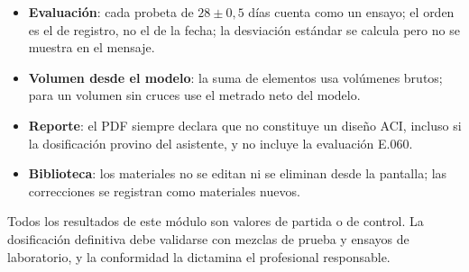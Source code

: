 \begin{itemize}
	      los de 0,15 a 4,75\,mm. Los límites de los husos son los del código; verifíquense contra la edición de la
	      NTP~400.037 y de la ASTM~C33 que corresponda. El módulo de finura calculado no actualiza el material.
	\item \textbf{Evaluación}: cada probeta de $28 \pm 0{,}5$ días cuenta como un ensayo; el orden es el de registro, no
	      el de la fecha; la desviación estándar se calcula pero no se muestra en el mensaje.
	\item \textbf{Volumen desde el modelo}: la suma de elementos usa volúmenes brutos; para un volumen sin cruces use el
	      metrado neto del modelo.
	\item \textbf{Reporte}: el PDF siempre declara que no constituye un diseño ACI, incluso si la dosificación provino
	      del asistente, y no incluye la evaluación E.060.
	\item \textbf{Biblioteca}: los materiales no se editan ni se eliminan desde la pantalla; las correcciones se
	      registran como materiales nuevos.
\end{itemize}

\begin{nota}
	Todos los resultados de este módulo son valores de partida o de control. La dosificación definitiva debe
	validarse con mezclas de prueba y ensayos de laboratorio, y la conformidad la dictamina el profesional responsable.
\end{nota}
